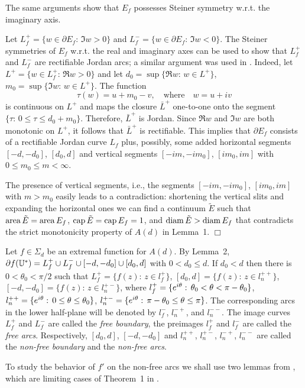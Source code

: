 The same arguments show that $E_f$ possesses Steiner symmetry w.r.t. the imaginary axis.

Let $L^+_f=\{w\in \partial E_f:\,\Im w>0\}$ and $L^-_f=\{w\in \partial E_f:\,\Im w<0\}$. The Steiner symmetries of $E_f$ w.r.t.
the real and imaginary axes can be used to show that $L^+_f$ and $L^-_f$ are rectifiable Jordan arcs; a similar argument was used 
in \cite[Lemma~4]{ASS2}. 
Indeed, let $L^+=\{w\in L^+_f:\,\Re w>0\}$ and let $d_0=\sup \{\Re w:\, w\in L^+ \}$, 
$m_0=\sup \{ \Im w:\,w\in L^+ \}$.  The function
$$
\tau(w)=u+m_0 -v, \quad {\mbox{where}}\quad w=u+iv
$$
is continuous on $ L^+ $ and maps the closure $\bar  L^+ $ one-to-one onto the segment $\{\tau:\,0\le \tau\le d_0+m_0 \}$. Therefore, 
$\bar  L^+ $ is Jordan.  Since $\Re w$ and $\Im w$ are both monotonic on $ L^+ $, it follows that $\bar  L^+ $ is rectifiable. This
implies that $\partial E_f$ consists of a rectifiable Jordan curve $L_f$ plus, possibly, some added  horizontal segments
$[-d,-d_0]$, $[d_0,d]$ and vertical segments $[-im,-im_0]$, $[im_0,im]$ with $0\le m_0\le m<\infty$.

The presence of vertical segments, i.e., the segments  $[-im,-im_0]$, $[im_0,im]$ with $m > m_0$ easily leads to a contradiction: shortening the vertical
slits and expanding the horizontal ones we can find a continuum $\tilde E$ such that 
${\rm area}\, \tilde E={\rm area}\, E_f$, ${\rm cap}\, \tilde E={\rm cap}\, E_f=1$, and ${\rm diam}\, \tilde E>{\rm diam}\, E_f$ that contradicts the strict monotonicity
property of $A(d)$ in Lemma~1.
$\Box$

Let $f\in \Sigma _d$ be an extremal function for $A(d)$. By Lemma~2, 
$\partial f({\Bbb{U}}^*)=L^+_f\cup L^-_f\cup [-d,-d_0]\cup [d_0,d]$ with $0<d_0\le d$. If $d_0<d$ then 
there is $0<\theta_0<\pi/2$ such that $L^+_f=\{f(z):\, z\in l^+_f\}$, $[d_0,d]=\{f(z):\, z\in l_n^{++}\}$, $[-d,-d_0]=
\{f(z):\,z\in l_n^{+-}\}$, where $l^+_f=\{e^{i\theta}:\,\theta_0<\theta<\pi-\theta_0\}$, $l_n^{++}=\{e^{i\theta}:\, 0\le \theta\le \theta_0\}$, 
$l_n^{+-}=\{e^{i\theta}:\, \pi-\theta_0\le\theta\le \pi\}$. The corresponding arcs in the lower half-plane will be denoted by $l_f^-$, $l_n^{-+}$, 
and $l_n^{--}$. The image curves $L_f^+$ and $L_f^-$ are called the {\it free boundary}, the preimages
 $l_f^+$ and $l_f^-$ are called the {\it free arcs}. Respectively, $[d_0,d]$, $[-d,-d_0]$ and $l_n^{++}$, $l_n^{+-}$, $l_n^{-+}$, $l_n^{--}$
are called the {\it non-free boundary} and the {\it non-free arcs}.

To study the behavior of $f'$ on the non-free arcs we shall use two lemmas from \cite{BS}, which are limiting
cases of Theorem~1 in \cite{S2}.

